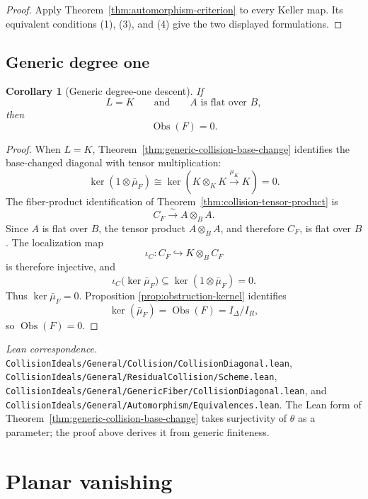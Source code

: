 \documentclass[11pt]{article}
\newtheorem{corollary}[theorem]{Corollary}
\theoremstyle{remark}
\theoremstyle{definition}
\newcommand{\Obs}{\operatorname{Obs}}
\newcommand{\leanpath}[1]{\texttt{\nolinkurl{#1}}}
\newenvironment{leanfiles}
  {\par\medskip\begingroup\footnotesize\raggedright\noindent
   \textit{Lean correspondence.}\ }
  {\par\endgroup\medskip}
\begin{document}
\begin{proof}
Apply Theorem~\ref{thm:automorphism-criterion} to every Keller map.
Its equivalent conditions \textup{(1)}, \textup{(3)}, and \textup{(4)}
give the two displayed formulations.
\end{proof}

\subsection{Generic degree one}

\begin{corollary}[Generic degree-one descent]
\label{cor:generic-degree-one-descent}
If
\[
  L=K
  \qquad\text{and}\qquad
  A\text{ is flat over }B,
\]
then
\[
  \Obs(F)=0.
\]
\end{corollary}

\begin{proof}
When \(L=K\), Theorem~\ref{thm:generic-collision-base-change}
identifies the base-changed diagonal with tensor multiplication:
\[
  \ker(1\otimes\bar\mu_F)
  \cong
  \ker\!\left(
    K\otimes_KK\xrightarrow{\mu_K}K
  \right)
  =
  0.
\]
The fiber-product identification of
Theorem~\ref{thm:collision-tensor-product} is
\[
  C_F\xrightarrow{\sim}A\otimes_BA.
\]
Since \(A\) is flat over \(B\), the tensor product \(A\otimes_BA\), and
therefore \(C_F\), is flat over \(B\).  The localization map
\[
  \iota_C\colon C_F\hookrightarrow K\otimes_BC_F
\]
is therefore injective, and
\[
  \iota_C\bigl(\ker\bar\mu_F\bigr)
  \subseteq
  \ker(1\otimes\bar\mu_F)
  =
  0.
\]
Thus \(\ker\bar\mu_F=0\).  Proposition
\ref{prop:obstruction-kernel} identifies
\[
  \ker(\bar\mu_F)=\Obs(F)=I_\Delta/I_R,
\]
so \(\Obs(F)=0\).
\end{proof}

\begin{leanfiles}
\leanpath{CollisionIdeals/General/Collision/CollisionDiagonal.lean},
\leanpath{CollisionIdeals/General/ResidualCollision/Scheme.lean},
\leanpath{CollisionIdeals/General/GenericFiber/CollisionDiagonal.lean}, and
\leanpath{CollisionIdeals/General/Automorphism/Equivalences.lean}.  The Lean form of
Theorem~\ref{thm:generic-collision-base-change} takes surjectivity of
\(\theta\) as a parameter; the proof above derives it from generic
finiteness.
\end{leanfiles}

\section{Planar vanishing}
\label{sec:planar-vanishing}
\end{document}

